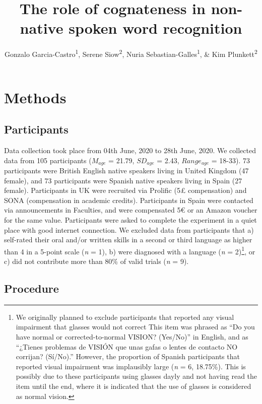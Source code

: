 \documentclass[
  english,
  man]{apa6}
\title{The role of cognateness in non-native spoken word recognition}
\author{Gonzalo Garcia-Castro\textsuperscript{1}, Serene Siow\textsuperscript{2}, Nuria Sebastian-Galles\textsuperscript{1}, \& Kim Plunkett\textsuperscript{2}}
\date{}
\affiliation{\phantom{0}}
\begin{document}
\maketitle

\hypertarget{methods}{%
\section{Methods}\label{methods}}

\hypertarget{participants}{%
\subsection{Participants}\label{participants}}

Data collection took place from 04th June, 2020 to 28th June, 2020. We collected data from 105 participants (\(M_{age}\) = 21.79, \(SD_{age}\) = 2.43, \(Range_{age}\) = 18-33). 73 participants were British English native speakers living in United Kingdom (47 female), and 73 participants were Spanish native speakers living in Spain (27 female). Participants in UK were recruited via Prolific (5£ compensation) and SONA (compensation in academic credits). Participants in Spain were contacted via announcements in Faculties, and were compensated 5€ or an Amazon voucher for the same value. Participants were asked to complete the experiment in a quiet place with good internet connection. We excluded data from participants that a) self-rated their oral and/or written skills in a second or third language as higher than 4 in a 5-point scale (\emph{n} = 1), b) were diagnosed with a language (\emph{n} = 2)\footnote{We originally planned to exclude participants that reported any visual impairment that glasses would not correct This item was phrased as ``Do you have normal or corrected-to-normal VISION? (Yes/No)'' in English, and as ``¿Tienes problemas de VISIÓN que unas gafas o lentes de contacto NO corrijan? (Sí/No).'' However, the proportion of Spanish participants that reported visual impairment was implausibly large (\emph{n} = 6, 18.75\%). This is possibly due to these participants using glasses dayly and not having read the item until the end, where it is indicated that the use of glasses is considered as normal vision.}, or c) did not contribute more than 80\% of valid trials (\emph{n} = 9).

\hypertarget{procedure}{%
\subsection{Procedure}\label{procedure}}
\end{document}
